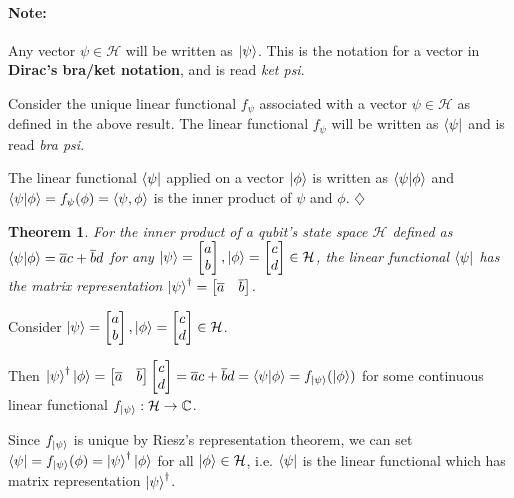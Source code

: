 \documentclass[12pt,twoside,fleqn]{report}
\makeatletter
\theoremstyle{thmstyle}
\renewenvironment{proof}[1][\proofname]{\par
\pushQED{\qed}%
\normalfont \topsep6\p@\@plus6\p@\relax
\trivlist
\item[\hskip\labelsep\itshape#1\@addpunct{.}]\mbox{}\par\nobreak\ignorespaces
}{%
    \popQED\endtrivlist\@endpefalse
    }
\newtheorem{thm}{Theorem}[chapter]
\newenvironment{note}{\paragraph{\textbf{Note:}}}{\hfill\ensuremath{\diamondsuit}}
\makeatother
\begin{document}
\begin{note}
    Any vector $\psi \in \mathcal{H}$ will be written as $\ket{\psi}$. This is the notation for a vector in \textbf{Dirac's bra/ket notation}, and is read \textit{ket psi}.

    Consider the unique linear functional $f_\psi$ associated with a vector $\psi \in \mathcal{H}$ as defined in the above result. The linear functional $f_\psi$ will be written as $\bra{\psi}$ and is read \textit{bra psi}.

    The linear functional $\bra{\psi}$ applied on a vector $\ket{\phi}$ is written as $\braket{\psi|\phi}$ and $\braket{\psi|\phi} = f_\psi(\phi) = \braket{\psi,\phi}$ is the inner product of $\psi$ and $\phi$.
\end{note}

\begin{thm}
    For the inner product of a qubit's state space $\mathcal{H}$ defined as $\braket{\psi|\phi} = \overline{a} c + \overline{b} d$ for any $\ket{\psi} = \begin{bmatrix} a \\ b\end{bmatrix}, \ket{\phi} = \begin{bmatrix} c \\ d \end{bmatrix} \in \mathcal{H}$, the linear functional $\bra{\psi}$ has the matrix representation $\ket{\psi}^\dagger = \begin{bmatrix} \overline{a} & \overline{b} \end{bmatrix}$. 
\end{thm}
\begin{proof}

    Consider $\ket{\psi} = \begin{bmatrix} a \\ b\end{bmatrix}, \ket{\phi} = \begin{bmatrix} c \\ d \end{bmatrix} \in \mathcal{H}$.

        Then $\ket{\psi}^\dagger \ket{\phi} = \begin{bmatrix}\overline{a} & \overline{b} \end{bmatrix}  \begin{bmatrix} c \\ d \end{bmatrix} = \overline{a} c + \overline{b} d = \braket{\psi|\phi} = f_{\ket{\psi}}(\ket{\phi})$ for some continuous linear functional $f_{\ket{\psi}}: \mathcal{H} \to \mathbb{C}$.

            Since $f_{\ket\psi}$ is unique by Riesz's representation theorem, we can set $\bra{\psi} = f_{\ket\psi}(\phi) = \ket{\psi}^\dagger \ket{\phi}$ for all $\ket\phi \in \mathcal{H}$, i.e. $\bra{\psi}$ is the linear functional which has matrix representation $\ket{\psi}^\dagger$.
\end{proof}
\end{document}
